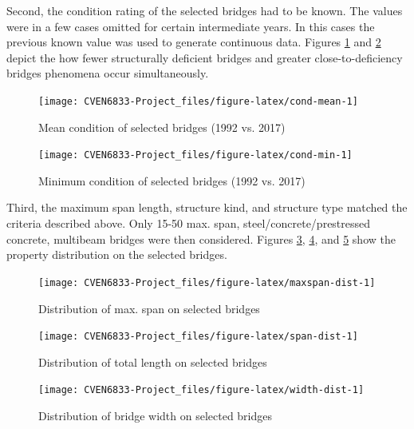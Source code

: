 \documentclass[]{book}
\theoremstyle{definition}
\theoremstyle{definition}
\theoremstyle{definition}
\theoremstyle{remark}
\begin{document}
Second, the condition rating of the selected bridges had to be known.
The values were in a few cases omitted for certain intermediate years.
In this cases the previous known value was used to generate continuous
data. Figures \ref{fig:cond-mean} and \ref{fig:cond-min} depict the how
fewer structurally deficient bridges and greater close-to-deficiency
bridges phenomena occur simultaneously.

\begin{figure}

{\centering \texttt{[image: CVEN6833-Project\_files/figure-latex/cond-mean-1]} 

}

\caption{Mean condition of selected bridges (1992 vs. 2017)}\label{fig:cond-mean}
\end{figure}\begin{figure}

{\centering \texttt{[image: CVEN6833-Project\_files/figure-latex/cond-min-1]} 

}

\caption{Minimum condition of selected bridges (1992 vs. 2017)}\label{fig:cond-min}
\end{figure}

Third, the maximum span length, structure kind, and structure type
matched the criteria described above. Only 15-50 max. span,
steel/concrete/prestressed concrete, multibeam bridges were then
considered. Figures \ref{fig:maxspan-dist}, \ref{fig:span-dist}, and
\ref{fig:width-dist} show the property distribution on the selected
bridges.

\begin{figure}

{\centering \texttt{[image: CVEN6833-Project\_files/figure-latex/maxspan-dist-1]} 

}

\caption{Distribution of max. span on selected bridges}\label{fig:maxspan-dist}
\end{figure}\begin{figure}

{\centering \texttt{[image: CVEN6833-Project\_files/figure-latex/span-dist-1]} 

}

\caption{Distribution of total length on selected bridges}\label{fig:span-dist}
\end{figure}\begin{figure}

{\centering \texttt{[image: CVEN6833-Project\_files/figure-latex/width-dist-1]} 

}

\caption{Distribution of bridge width on selected bridges}\label{fig:width-dist}
\end{figure}
\end{document}
